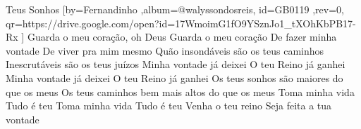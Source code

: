\beginsong
{Teus Sonhos %
}[by={Fernandinho %
},album={@walyssondosreis},
id={GB0119 %
},rev={0}, %
qr={https://drive.google.com/open?id=17WmoimG1fO9YSznJo1_tXOhKbPB17-Rx %
}]
\beginverse*
Guarda o meu coração, oh Deus
Guarda o meu coração
De fazer minha vontade
De viver pra mim mesmo
\endverse
\beginverse*
Quão insondáveis são os teus caminhos
Inescrutáveis são os teus juízos
\endverse
\beginverse*
Minha vontade já deixei
O teu Reino já ganhei
Minha vontade já deixei
O teu Reino já ganhei
\endverse
\beginchorus
Os teus sonhos são maiores do que os meus
Os teus caminhos bem mais altos do que os meus
Toma minha vida
Tudo é teu
Toma minha vida
Tudo é teu
\endchorus
\beginverse*
Venha o teu reino
Seja feita a tua vontade
\endverse
\vspace{4em} %
\begin{comment}
\lstset{basicstyle=\scriptsize\bf} %
\tab{Solo 1}
\begin{lstlisting}
E|-----------------------------------------------------|
B|-----------------------------------------------------|
G|-----------------------------------------------------|
D|-----------------------------------------------------|
A|-----------------------------------------------------|
E|-----------------------------------------------------|
\end{lstlisting}
\end{comment}
 
